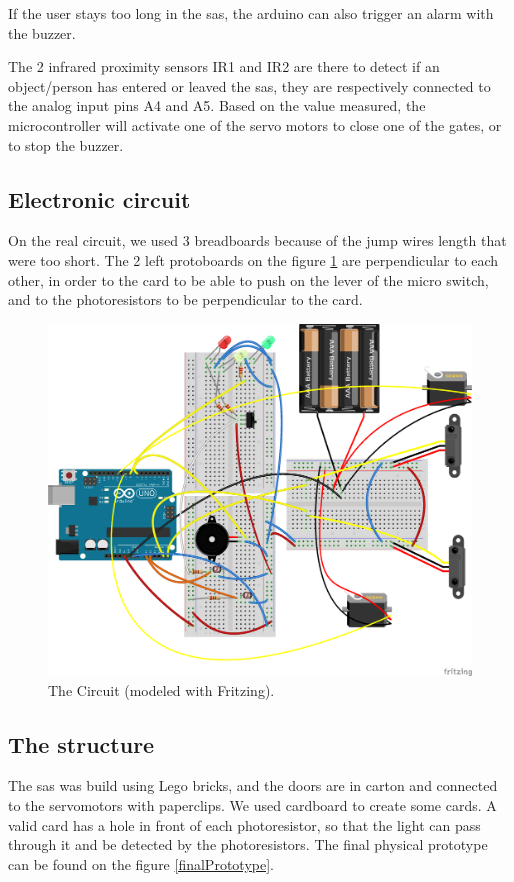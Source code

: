 If the user stays too long in the sas, the arduino can also trigger an alarm with the buzzer.

The 2 infrared proximity sensors IR1 and IR2 are there to detect if an object/person has entered or leaved the sas, they are respectively connected to the analog input pins A4 and A5. Based on the value measured, the microcontroller will activate one of the servo motors to close one of the gates, or to stop the buzzer.

\subsection{Electronic circuit}
On the real circuit, we used 3 breadboards because of the jump wires length that were too short. The 2 left protoboards on the figure \ref{circuit} are perpendicular to each other, in order to the card to be able to push on the lever of the micro switch, and to the photoresistors to be perpendicular to the card.

\begin{figure}[!h]
	\centering
    \includegraphics[scale=0.5]{ElectronicScheme2.png}
    \caption{The Circuit (modeled with Fritzing).}
    \label{circuit}
\end{figure}

\subsection{The structure}
The sas was build using Lego bricks, and the doors are in carton and connected to the servomotors with paperclips. We used cardboard to create some cards. A valid card has a hole in front of each photoresistor, so that the light can pass through it and be detected by the photoresistors. The final physical prototype can be found on the figure \ref{finalPrototype}.

